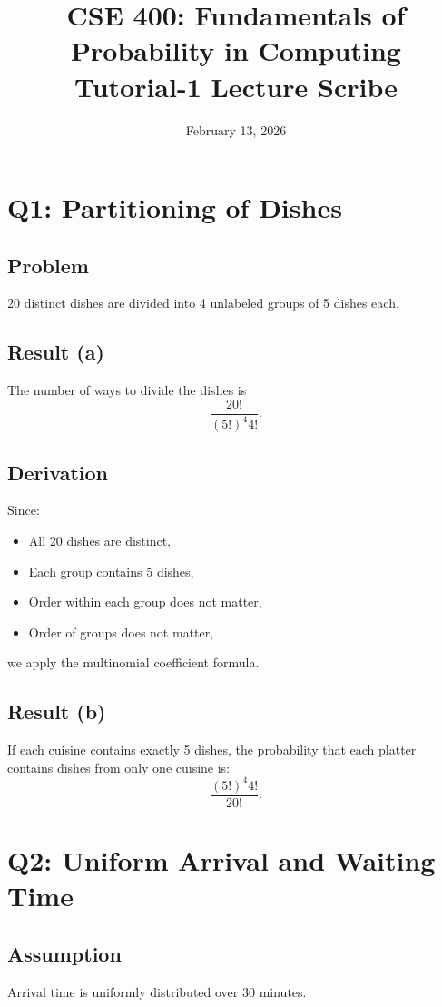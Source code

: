 \documentclass[12pt]{article}
\title{CSE 400: Fundamentals of Probability in Computing\\
Tutorial-1 Lecture Scribe}
\date{February 13, 2026}
\begin{document}
\maketitle

\section*{Q1: Partitioning of Dishes}

\subsection*{Problem}
20 distinct dishes are divided into 4 unlabeled groups of 5 dishes each.

\subsection*{Result (a)}
The number of ways to divide the dishes is
\[
\frac{20!}{(5!)^4 4!}.
\]

\subsection*{Derivation}
Since:
\begin{itemize}
    \item All 20 dishes are distinct,
    \item Each group contains 5 dishes,
    \item Order within each group does not matter,
    \item Order of groups does not matter,
\end{itemize}
we apply the multinomial coefficient formula.

\subsection*{Result (b)}
If each cuisine contains exactly 5 dishes, the probability that each platter contains dishes from only one cuisine is:
\[
\frac{(5!)^4 4!}{20!}.
\]

\section*{Q2: Uniform Arrival and Waiting Time}

\subsection*{Assumption}
Arrival time is uniformly distributed over 30 minutes.
\end{document}
